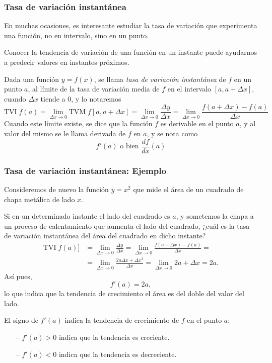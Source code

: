 \begin{frame}
	\frametitle{Tasa de variación instantánea}
	En muchas ocasiones, es interesante estudiar la tasa de variación que experimenta una función, no en intervalo, sino en
	un punto.
	
	Conocer la tendencia de variación de una función en un instante puede ayudarnos a predecir valores en instantes
	próximos.
	
	\begin{definicion}
		Dada una función $y=f(x)$, se llama \emph{tasa de variación instantánea} de $f$ en un punto $a$, al límite de la tasa de
		variación media de $f$ en el intervalo $[a,a+\Delta x]$, cuando $\Delta x$ tiende a 0, y lo notaremos
		\[
			\textrm{TVI}\;f (a)=\lim_{\Delta x\rightarrow 0} \textrm{TVM}\; f[a,a+\Delta x]=\lim_{\Delta x\rightarrow 0}\frac{\Delta y}{\Delta x}=\lim_{\Delta x\rightarrow 0}\frac{f(a+\Delta x)-f(a)}{\Delta x}
		\]
		Cuando este límite existe, se dice que la función $f$ es derivable en el punto $a$, y al valor del mismo se le llama
		derivada de $f$ en $a$, y se nota como
		\[
			f'(a) \mbox{ o bien } \frac{df}{dx}(a)
		\]
	\end{definicion}
\end{frame}


\begin{frame}
	\frametitle{Tasa de variación instantánea: Ejemplo}
	Consideremos de nuevo la función $y=x^2$ que mide el área de un cuadrado de chapa metálica de lado $x$.
	
	Si en un determinado instante el lado del cuadrado es $a$, y sometemos la chapa a un proceso de calentamiento que
	aumenta el lado del cuadrado, ¿cuál es la tasa de variación instantánea del área del cuadrado en dicho instante?
	\begin{align*}
		\textrm{TVI}\;f(a)] & =\lim_{\Delta x\rightarrow 0}\frac{\Delta y}{\Delta x}=\lim_{\Delta x\rightarrow 0}\frac{f(a+\Delta x)-f(a)}{\Delta x} = \\
		                    & =\lim_{\Delta x\rightarrow 0}\frac{2a\Delta x+\Delta x^2}{\Delta x}=\lim_{\Delta x\rightarrow 0} 2a+\Delta x= 2a.        
	\end{align*}
	Así pues,
	\[
		f'(a)=2a,
	\]
	lo que indica que la tendencia de crecimiento el área es del doble del valor del lado.
	
	El signo de $f'(a)$ indica la tendencia de crecimiento de $f$ en el punto $a$:
	\begin{itemize}
		\item[--]  $f'(a)>0$ indica que la tendencia es creciente.
		\item[--]  $f'(a)<0$ indica que la tendencia es decreciente.
	\end{itemize}
\end{frame}


